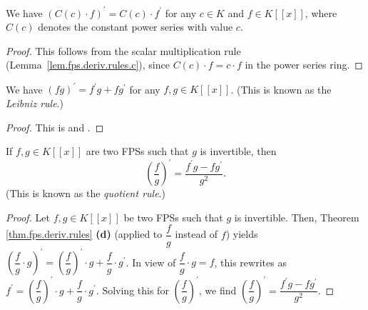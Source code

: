 \begin{lemma}
\label{lem.fps.deriv.C-mul}
\leanhelper
\leanok
We have $(C(c) \cdot f)^{\prime} = C(c) \cdot f^{\prime}$ for any $c\in K$
and $f\in K\left[  \left[  x\right]  \right]$, where $C(c)$ denotes the
constant power series with value $c$.
\end{lemma}

\begin{proof}
\leanok
This follows from the scalar multiplication rule (Lemma~\ref{lem.fps.deriv.rules.c}),
since $C(c) \cdot f = c \cdot f$ in the power series ring.
\end{proof}

\begin{lemma}
\label{lem.fps.deriv.rules.d}
\leanhelper
\leanok
We have $\left(  fg\right)  ^{\prime}=f^{\prime}g+fg^{\prime}$
for any $f,g\in K\left[  \left[  x\right]  \right]  $. (This is known as the
\emph{Leibniz rule}.)
\end{lemma}

\begin{proof}
\leanok
This is \cite[Exercise 5 \textbf{(c)}]{19s-mt3s} and
\cite[Proposition 0.2 \textbf{(c)}]{logexp}.
\end{proof}

\begin{lemma}
\label{lem.fps.deriv.rules.e}
\leanhelper
\leanok
If $f,g\in K\left[  \left[  x\right]  \right]  $ are two FPSs
such that $g$ is invertible, then%
\[
\left(  \dfrac{f}{g}\right)  ^{\prime}=\dfrac{f^{\prime}g-fg^{\prime}}{g^{2}%
}.
\]
(This is known as the \emph{quotient rule}.)
\end{lemma}

\begin{proof}
Let $f,g\in K\left[  \left[  x\right]  \right]  $ be two FPSs
such that $g$ is invertible. Then, Theorem \ref{thm.fps.deriv.rules}
\textbf{(d)} (applied to $\dfrac{f}{g}$ instead of $f$) yields $\left(
\dfrac{f}{g}\cdot g\right)  ^{\prime}=\left(  \dfrac{f}{g}\right)  ^{\prime
}\cdot g+\dfrac{f}{g}\cdot g^{\prime}$. In view of $\dfrac{f}{g}\cdot g=f$,
this rewrites as $f^{\prime}=\left(  \dfrac{f}{g}\right)  ^{\prime}\cdot
g+\dfrac{f}{g}\cdot g^{\prime}$. Solving this for $\left(  \dfrac{f}%
{g}\right)  ^{\prime}$, we find $\left(  \dfrac{f}{g}\right)  ^{\prime}%
=\dfrac{f^{\prime}g-fg^{\prime}}{g^{2}}$.
\end{proof}

